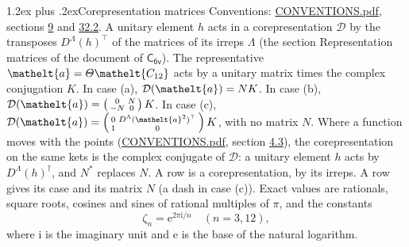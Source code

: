 \documentclass[10pt,a4paper]{article}
\makeatletter
\renewcommand\section{\@startsection{section}{1}{\z@}{-3ex plus -1ex minus -.2ex}%
  {1.2ex plus .2ex}{\normalfont\large\sffamily\bfseries\color{parttitle}}}
\numberwithin{equation}{section}
\newcommand{\eltfont}[1]{{\let\sigma\eltsigma\mathelt{#1}}}
\newcommand{\grp}[1]{\mathsf{#1}}
\newcommand{\elt}[1]{\eltfont{#1}}
\newcommand{\iunit}{\mathrm{i}}
\newcommand{\expe}{\mathrm{e}}
\newcommand{\rootunity}[1]{\zeta_{#1}}
\makeatother
\begin{document}
\section{Corepresentation matrices}\label{s:corep_matrices}
Conventions: \href{../../CONVENTIONS.pdf}{CONVENTIONS.pdf}, sections \href{../../../rotation/CONVENTIONS.pdf\#conv.9}{9} and \href{../../CONVENTIONS.pdf\#conv.32.2}{32.2}.
A unitary element $h$ acts in a corepresentation $\mathcal{D}$ by the transposes $D^{\Lambda}(h)^{\top}$ of the matrices of its irreps $\Lambda$ (the section Representation matrices of the document of \href{../../../rotation/data/pdf/C6v.pdf}{$\grp{C_{6v}}$}). The representative $\elt{a} = \varTheta\elt{C_{12}}$ acts by a unitary matrix times the complex conjugation $K$.
In case (a), $\mathcal{D}(\elt{a}) = NK$. In case (b), $\mathcal{D}(\elt{a}) = \left(\begin{smallmatrix} 0 & N \\ -N & 0 \end{smallmatrix}\right) K$. In case (c), $\mathcal{D}(\elt{a}) = \left(\begin{smallmatrix} 0 & D^{\Lambda}(\elt{a}^2)^{\top} \\ 1 & 0 \end{smallmatrix}\right) K$, with no matrix $N$.
Where a function moves with the points (\href{../../CONVENTIONS.pdf}{CONVENTIONS.pdf}, section \href{../../../rotation/CONVENTIONS.pdf\#conv.4.3}{4.3}), the corepresentation on the same kets is the complex conjugate of $\mathcal{D}$: a unitary element $h$ acts by $D^{\Lambda}(h)^{\dagger}$, and $N^{*}$ replaces $N$.
A row is a corepresentation, by its irreps. A row gives its case and its matrix $N$ (a dash in case (c)).
\leavevmode\label{n:constant.root}\label{n:index.root.order}Exact values are rationals, square roots, cosines and sines of rational multiples of $\pi$, and the constants
\begin{equation}\label{e:constants}\rootunity{n} = \expe^{2\pi\iunit/n}\quad(n = 3, 12),\end{equation}
where $\iunit$ is the imaginary unit and $\expe$ is the base of the natural logarithm.
\end{document}

